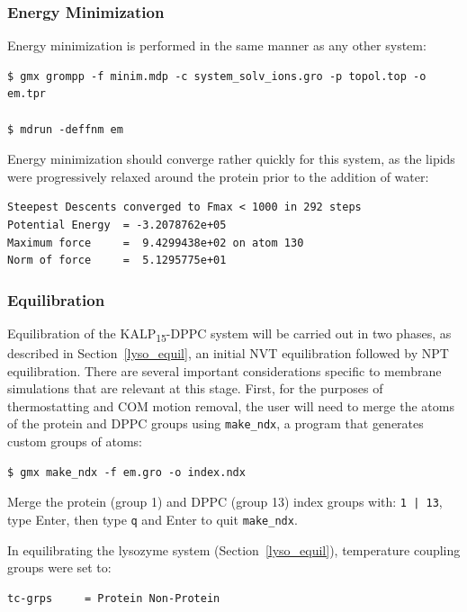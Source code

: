\documentclass[9pt,tutorial,pubversion]{livecoms}
\begin{document}
\subsubsection{Energy Minimization} \label{kalp_em}

Energy minimization is performed in the same manner as any other system:

\begin{lstlisting}
$ gmx grompp -f minim.mdp -c system_solv_ions.gro -p topol.top -o em.tpr

$ mdrun -deffnm em
\end{lstlisting}

Energy minimization should converge rather quickly for this system, as the lipids were progressively relaxed around the protein prior to the addition of water:

\begin{lstlisting}[basicstyle=\footnotesize\ttfamily]
Steepest Descents converged to Fmax < 1000 in 292 steps
Potential Energy  = -3.2078762e+05
Maximum force     =  9.4299438e+02 on atom 130
Norm of force     =  5.1295775e+01
\end{lstlisting}

\subsubsection{Equilibration} \label{kalp_equil}

Equilibration of the KALP\textsubscript{15}-DPPC system will be carried out in two phases, as described in Section~\ref{lyso_equil}, an initial NVT equilibration followed by NPT equilibration. There are several important considerations specific to membrane simulations that are relevant at this stage. First, for the purposes of thermostatting and COM motion removal, the user will need to merge the atoms of the protein and DPPC groups using \texttt{make\_ndx}, a program that generates custom groups of atoms:

\begin{lstlisting}
$ gmx make_ndx -f em.gro -o index.ndx
\end{lstlisting}
%
Merge the protein (group 1) and DPPC (group 13) index groups with: \texttt{1 | 13}, type Enter, then type \texttt{q} and Enter to quit \texttt{make\_ndx}.

In equilibrating the lysozyme system (Section~\ref{lyso_equil}), temperature coupling groups were set to:

\begin{lstlisting}
tc-grps     = Protein Non-Protein
\end{lstlisting}
\end{document}
